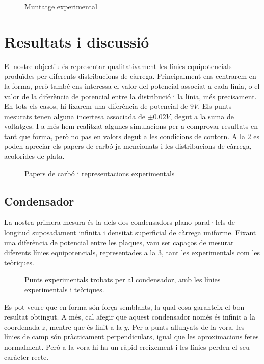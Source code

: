 \begin{figure}[htb]
	\centering
	\caption{Muntatge experimental}
	\label{fig:muntatge}
\end{figure}

\section{Resultats i discussió}
El nostre objectiu és representar qualitativament les línies equipotencials produïdes per diferents distribucions de càrrega. Principalment ens centrarem en la forma, però també ens interessa el valor del potencial associat a cada línia, o el valor de la diferència de potencial entre la distribució i la línia, més precisament. En tots els casos, hi fixarem una diferència de potencial de $9V$. Els punts mesurats tenen alguna incertesa associada de $\pm0.02V$, degut a la suma de voltatges. I a més hem realitzat algunes simulacions per a comprovar resultats en tant que forma, però no pas en valors degut a les condicions de contorn. A la \cref{fig:camp carbo} es poden apreciar els papers de carbó ja mencionats i les distribucions de càrrega, acolorides de plata.

\begin{figure}[htb]
  \centering
  \caption{Papers de carbó i representacions experimentals}
  \label{fig:camp carbo}
\end{figure}
\subsection{Condensador}
La nostra primera mesura és la dels dos condensadors plano-paral·lels de longitud suposadament infinita i densitat superficial de càrrega uniforme. Fixant una diferència de potencial entre les plaques, vam ser capaços de mesurar diferents línies equipotencials, representades a la \cref{fig:camp condensador}, tant les experimentals com les teòriques.

\begin{figure}[htb]
  \centering
  \caption{ Punts experimentals trobats per al condensador, amb les línies experimentals i teòriques.}
  \label{fig:camp condensador}
\end{figure}

Es pot veure que en forma són força semblants, la qual cosa garanteix el bon resultat obtingut. A més, cal afegir que aquest condensador només és infinit a la coordenada $z$, mentre que és finit a la $y$. Per a punts allunyats de la vora, les línies de camp són pràcticament perpendiculars, igual que les aproximacions fetes normalment. Però a la vora hi ha un ràpid creixement i les línies perden el seu caràcter recte.


